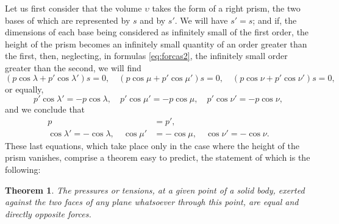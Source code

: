 \documentclass[leqno,openright,smallroyalvopaper,8pt,twoside,showtrims]{memoir}
\newtheorem{thm}{Theorem}
\begin{document}
Let us first consider that the volume $\upsilon$ takes the form of a right prism, the two bases of which are represented by $s$ and by $s'$. We will have $s'=s$; and if, the dimensions of each base being considered as infinitely small of the first order, the height of the prism becomes an infinitely small quantity of an order greater than the first, then, neglecting, in formulas \eqref{eq:forcas2}, the infinitely small order greater than the second, we will find
\begin{equation*}
(p\cos\lambda+p'\cos\lambda')s=0, \quad(p\cos\mu+p'\cos\mu')s=0,\quad(p\cos\nu+p'\cos\nu')s=0,
\end{equation*}
or equally,
\begin{equation*}
p'\cos\lambda'=-p\cos\lambda, \quad p'\cos\mu'=-p\cos\mu,\quad p'\cos\nu'=-p\cos\nu,
\end{equation*}
and we conclude that
\begin{align*}
p&=p',\\
\cos\lambda'=-\cos\lambda,\quad \cos\mu'&=-\cos\mu,\quad \cos\nu'=-\cos\nu.
\end{align*}
These last equations, which take place only in the case where the height of the prism vanishes, comprise a theorem easy to predict, the statement of which is the following:
\begin{thm}
The pressures or tensions, at a given point of a solid body, exerted against the two faces of any plane whatsoever through this point, are equal and directly opposite forces.
\end{thm} 
\end{document}
